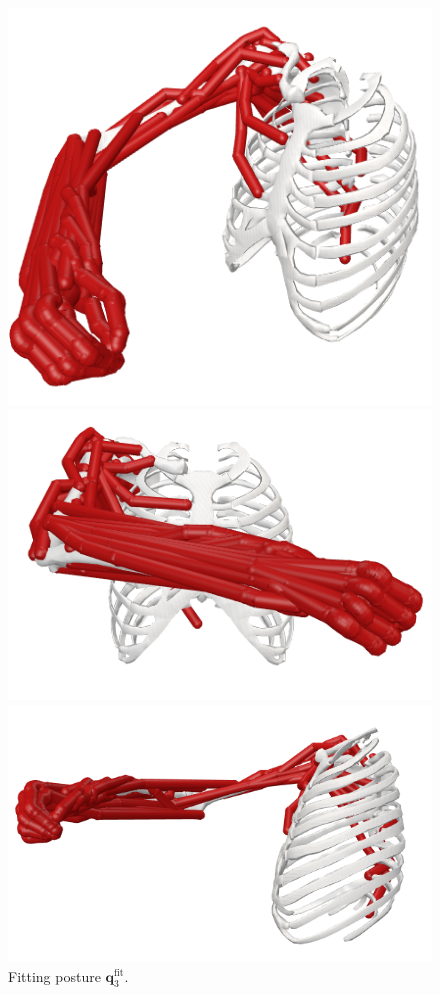 \begin{figure}[!htb]
    \centering
    \captionsetup{justification=centering}
    \begin{minipage}{0.3\linewidth}
        \centering
        \includegraphics[trim={0 0 0 0}, clip, width=0.7\linewidth]{img/chapter_4/pose_6_view.png}
    \end{minipage}
    \hfill
    \begin{minipage}{0.3\linewidth}
        \captionsetup{justification=centering}
        \centering
        \includegraphics[trim={0 0 0 0}, clip, width=0.8\linewidth]{img/chapter_4/pose_6_front.png}
    \end{minipage}
    \hfill
    \begin{minipage}{0.3\linewidth}
        \captionsetup{justification=centering}
        \centering
        \includegraphics[trim={10 0 0 0}, clip, width=0.9\linewidth]{img/chapter_4/pose_6_side.png}
    \end{minipage}
    \caption{Fitting posture $\mathbf{q}_3^{\text{fit}}$.}
    \label{fig:pose_3}
\end{figure}

